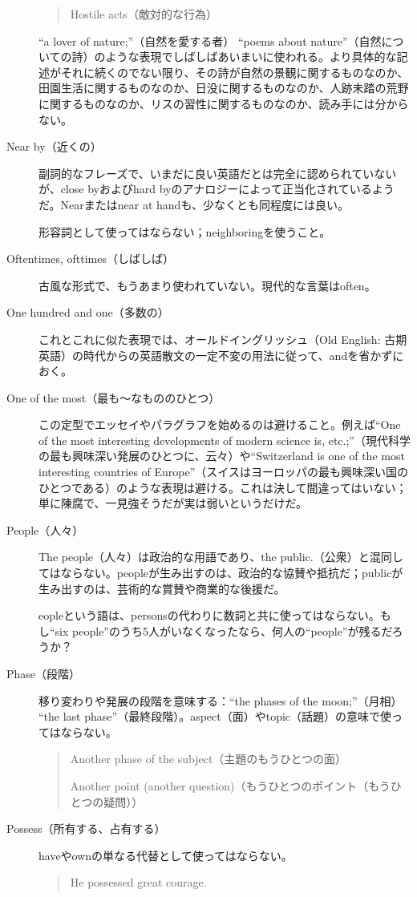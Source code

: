 \begin{description}
\begin{quote}
    Hostile acts（敵対的な行為）
\end{quote}
``a lover of nature;''（自然を愛する者） ``poems about
nature''（自然についての詩）のような表現でしばしばあいまいに使われる。より具体的な記述がそれに続くのでない限り、その詩が自然の景観に関するものなのか、田園生活に関するものなのか、日没に関するものなのか、人跡未踏の荒野に関するものなのか、リスの習性に関するものなのか、読み手には分からない。
\item [Near by（近くの）]副詞的なフレーズで、いまだに良い英語だとは完全に認められていないが、close
byおよびhard
byのアナロジーによって正当化されているようだ。Nearまたはnear at
handも、少なくとも同程度には良い。
\par 形容詞として使ってはならない；neighboringを使うこと。
\item [Oftentimes, ofttimes（しばしば）] 古風な形式で、もうあまり使われていない。現代的な言葉はoften。
\item [One hundred and one（多数の）]これとこれに似た表現では、オールドイングリッシュ（Old English:
古期英語）の時代からの英語散文の一定不変の用法に従って、andを省かずにおく。
\item [One of the most（最も～なもののひとつ）]この定型でエッセイやパラグラフを始めるのは避けること。例えば``One
of the most interesting developments of modern science is,
etc.;''（現代科学の最も興味深い発展のひとつに、云々）や``Switzerland is
one of the most interesting countries of
Europe''（スイスはヨーロッパの最も興味深い国のひとつである）のような表現は避ける。これは決して間違ってはいない；単に陳腐で、一見強そうだが実は弱いというだけだ。
\item [People（人々）]The people（人々）は政治的な用語であり、the
public.（公衆）と混同してはならない。peopleが生み出すのは、政治的な協賛や抵抗だ；publicが生み出すのは、芸術的な賞賛や商業的な後援だ。\par eopleという語は、personsの代わりに数詞と共に使ってはならない。もし``six
people''のうち5人がいなくなったなら、何人の``people''が残るだろうか？
\item [Phase（段階）] 移り変わりや発展の段階を意味する：``the phases of the
moon;''（月相） ``the last
phase''（最終段階）。aspect（面）やtopic（話題）の意味で使ってはならない。
\begin{quote}
 Another phase of the subject（主題のもうひとつの面）
 
 Another point (another question)（もうひとつのポイント（もうひとつの疑問））
\end{quote}
\item [Possess（所有する、占有する）]haveやownの単なる代替として使ってはならない。
\begin{quote}
    He possessed great courage.
    

\end{quote}
\end{description}
